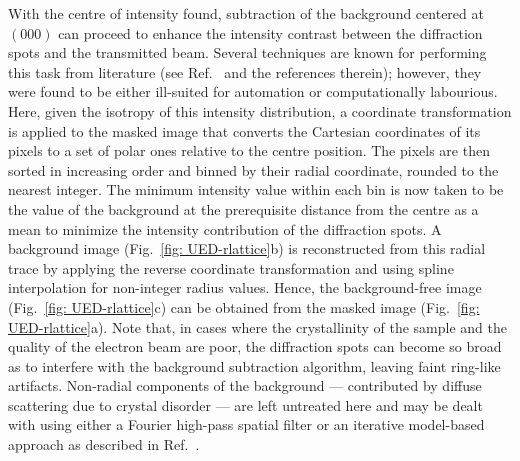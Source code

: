 With the centre of intensity found, subtraction of the background centered at $(000)$ can proceed
to enhance the intensity contrast between the diffraction spots and the transmitted beam.
%
Several techniques are known for performing this task
from literature (see Ref.~\cite{Downing2001} and the references therein);
however, they were found to be either ill-suited for automation or computationally labourious.
%
Here, given the isotropy of this intensity distribution, a coordinate transformation is applied
to the masked image that converts the Cartesian coordinates of its pixels to a set of polar ones
relative to the centre position. The pixels are then sorted in increasing order and
binned by their radial coordinate, rounded to the nearest integer.
The minimum intensity value within each bin is now taken to be the value of the background
at the prerequisite distance from the centre
as a mean to minimize the intensity contribution of the diffraction spots.
A background image (Fig.~\ref{fig: UED-rlattice}b) is reconstructed from this radial trace
by applying the reverse coordinate transformation and
using spline interpolation for non-integer radius values.
%
Hence, the background-free image (Fig.~\ref{fig: UED-rlattice}c) can be obtained
from the masked image (Fig.~\ref{fig: UED-rlattice}a).
%
Note that, in cases where the crystallinity of the sample and the quality of the electron beam
are poor, the diffraction spots can become so broad as to interfere
with the background subtraction algorithm, leaving faint ring-like artifacts.
%
Non-radial components of the background --- contributed by diffuse scattering due to crystal disorder ---
are left untreated here and may be dealt with using either a Fourier high-pass spatial filter
or an iterative model-based approach as described in Ref.~\cite{Grigorieff1995}.

